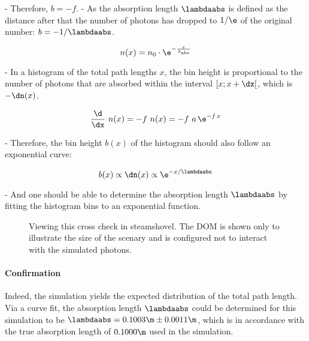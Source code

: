 - Therefore, $b = -f$.
- As the absorption length $\lambdaabs$ is defined as the distance after that the number of photons has dropped to $1/\e$ of the original number: $b = -1/\lambdaabs$.


$$
  n(x) = n_0 \cdot \e^{-\frac{x}{\lambda_\text{abs}}}
$$

%

- In a histogram of the total path lengths $x$, the bin height is proportional to the number of photons that are absorbed within the interval $[x; x + \dx[$, which is $-\dn(x)$.

$$ \frac{\d}{\dx}\ n(x) = -f\ n(x)
  = -f\ a\,\e^{-f\,x} $$

- Therefore, the bin height $b(x)$ of the histogram should also follow an exponential curve:

$$ b(x) \propto \dn(x) \propto \e^{-x/\lambdaabs} $$

- And one should be able to determine the absorption length $\lambdaabs$ by fitting the histogram bins to an exponential function.

\begin{figure}
  \caption{Viewing this cross check in steamshovel. The DOM is shown only to illustrate the size of the scenary and is configured not to interact with the simulated photons.}
\end{figure}

\paragraph{Confirmation} Indeed, the simulation yields the expected distribution of the total path length. Via a curve fit, the absorption length $\lambdaabs$ could be determined for this simulation to be $\lambdaabs = 0.1003\m \pm 0.0011\m$, which is in accordance with the true absorption length of $0.1000\m$ used in the simulation.

